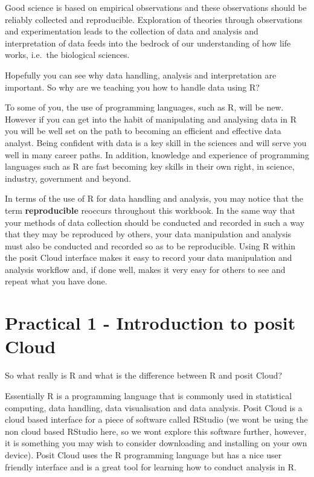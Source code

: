 \documentclass[
]{book}
\begin{document}
Good science is based on empirical observations and these observations should be reliably collected and reproducible. Exploration of theories through observations and experimentation leads to the collection of data and analysis and interpretation of data feeds into the bedrock of our understanding of how life works, i.e.~the biological sciences.

Hopefully you can see why data handling, analysis and interpretation are important. So why are we teaching you how to handle data using R?

To some of you, the use of programming languages, such as R, will be new. However if you can get into the habit of manipulating and analysing data in R you will be well set on the path to becoming an efficient and effective data analyst. Being confident with data is a key skill in the sciences and will serve you well in many career paths. In addition, knowledge and experience of programming languages such as R are fast becoming key skills in their own right, in science, industry, government and beyond.

In terms of the use of R for data handling and analysis, you may notice that the term \textbf{reproducible} reoccurs throughout this workbook. In the same way that your methods of data collection should be conducted and recorded in such a way that they may be reproduced by others, your data manipulation and analysis must also be conducted and recorded so as to be reproducible. Using R within the posit Cloud interface makes it easy to record your data manipulation and analysis workflow and, if done well, makes it very easy for others to see and repeat what you have done.

\section{Practical 1 - Introduction to posit Cloud}\label{intro-to-posit}

So what really is R and what is the difference between R and posit Cloud?

Essentially R is a programming language that is commonly used in statistical computing, data handling, data visualisation and data analysis. Posit Cloud is a cloud based interface for a piece of software called RStudio (we wont be using the non cloud based RStudio here, so we wont explore this software further, however, it is something you may wish to consider downloading and installing on your own device). Posit Cloud uses the R programming language but has a nice user friendly interface and is a great tool for learning how to conduct analysis in R.
\end{document}
